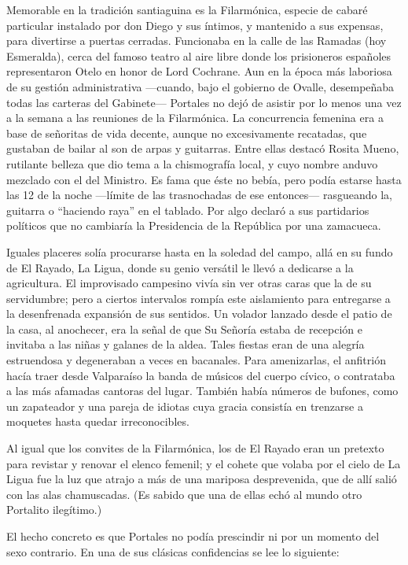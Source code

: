 \documentclass[10pt,twoside,openright]{memoir}
\begin{document}
Memorable en la tradición santiaguina es la Filarmónica, especie de
cabaré particular instalado por don Diego y sus íntimos, y mantenido a
sus expensas, para divertirse a puertas cerradas. Funcionaba en la calle
de las Ramadas (hoy Esmeralda), cerca del famoso teatro al aire libre
donde los prisioneros españoles representaron Otelo en honor de Lord
Cochrane. Aun en la época más laboriosa de su gestión
administrativa ---cuando, bajo el
gobierno de Ovalle, desempeñaba todas las carteras del Gabinete---
Portales no dejó de asistir por lo menos una vez a la
semana a las reuniones de la
Filarmónica. La concurrencia femenina era a base de señoritas de vida
decente, aunque no excesivamente recatadas, que gustaban de bailar al
son de arpas y guitarras. Entre ellas destacó Rosita Mueno, rutilante
belleza que dio tema a la chismografía local, y cuyo nombre anduvo
mezclado con el del Ministro. Es fama que éste no bebía, pero podía
estarse hasta las 12 de la noche ---límite de las trasnochadas de ese
entonces--- rasgueando la, guitarra o ``haciendo raya'' en el tablado. Por
algo declaró a sus partidarios políticos que no cambiaría la Presidencia
de la República por una zamacueca.

Iguales placeres solía procurarse hasta en la soledad del campo, allá en
su fundo de El Rayado, La Ligua,
donde su genio versátil le llevó a dedicarse a la agricultura. El
improvisado campesino vivía sin ver otras caras que la de su
servidumbre; pero a ciertos intervalos rompía este aislamiento para
entregarse a la desenfrenada
expansión de sus sentidos. Un volador lanzado desde el patio de la casa,
al anochecer, era la señal de que Su Señoría estaba de recepción e
invitaba a las niñas y galanes de la aldea. Tales fiestas eran de una
alegría estruendosa y degeneraban a veces en bacanales. Para
amenizarlas, el anfitrión hacía traer desde Valparaíso la banda de
músicos del cuerpo cívico, o contrataba a las más afamadas cantoras del
lugar. También había números de bufones, como un zapateador y una pareja
de idiotas cuya gracia consistía en trenzarse a moquetes hasta quedar
irreconocibles.

Al igual que los convites de la Filarmónica, los de El Rayado eran un pretexto para
revistar y renovar el elenco femenil; y el cohete que volaba por el
cielo de La Ligua fue la luz que atrajo a más de una mariposa
desprevenida, que de allí salió con las alas chamuscadas. (Es sabido que
una de ellas echó al mundo otro Portalito ilegítimo.)

El hecho concreto es que Portales no podía prescindir ni por un momento
del sexo contrario. En una de sus clásicas confidencias se lee lo
siguiente:
\end{document}
